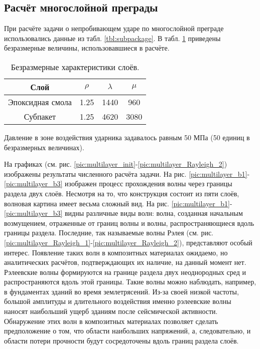 \subsection{Расчёт многослойной преграды}
При расчёте задачи о непробивающем ударе по многослойной преграде использовались
данные из табл. \ref{tbl:subpackage}. В табл. \ref{tbl:subpackage_2} приведены
безразмерные величины, использовавшиеся в расчёте.
\begin{table}[h]
\centering
\begin{tabular}{|c|c|c|c|}
\hline
Слой & $\rho$ & $\lambda$ & $\mu$  \\
\hline
Эпоксидная смола & 1.25 & 1440 & 960 \\
Субпакет & 1.25 & 4620 & 3080 \\
\hline
\end{tabular}
\caption{Безразмерные характеристики слоёв.}
\label{tbl:subpackage_2}
\end{table}

Давление в зоне воздействия ударника задавалось равным 50 МПа (50 единиц в безразмерных величинах).

На графиках (см. рис. \ref{pic:multilayer_init}-\ref{pic:multilayer_Rayleigh_2})
изображены результаты численного расчёта задачи.
На рис. \ref{pic:multilayer_b1}-\ref{pic:multilayer_b3} изображен процесс
прохождения волны через границы раздела двух слоёв. Несмотря на то, что
конструкция состоит из пяти слоёв, волновая картина имеет весьма сложный
вид. На рис. \ref{pic:multilayer_b1}-\ref{pic:multilayer_b3} видны различные
виды волн: волна, созданная начальным возмущением, отраженные от границ волны и
волны, распространяющиеся вдоль границы раздела. Последние, так называемые волны
Рэлея (см. рис. \ref{pic:multilayer_Rayleigh_1}-\ref{pic:multilayer_Rayleigh_2}), 
представляют особый интерес. Появление таких волн в композитных материалах
ожидаемо, но аналитических расчётов, подтверждающих их наличие, на данный момент
нет. Рэлеевские волны формируются на границе раздела двух неоднородных сред и
распространяются вдоль этой границы. Такие волны можно наблюдать, например, в фундаментах
зданий во время землетрясений. Из-за своей низкой частоты, большой
амплитуды и длительного воздействия именно рэлеевские волны наносят наибольший
ущерб зданиям после сейсмической активности. Обнаружение этих волн в композитных
материалах позволяет сделать предположение о том, что области наибольших
напряжений, а, следовательно, и области потери прочности будут сосредоточены
вдоль границ раздела слоёв.

